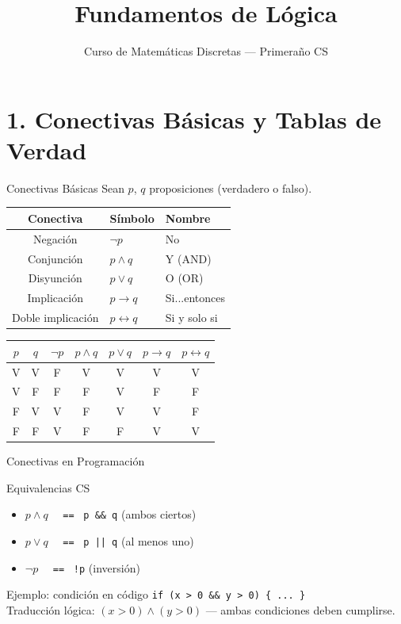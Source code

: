 \documentclass[aspectratio=169,10pt]{beamer}
\title{Fundamentos de Lógica}
\subtitle{Curso de Matemáticas Discretas — Primeraño CS}
\author{}
\date{}
\begin{document}
\section{1. Conectivas Básicas y Tablas de Verdad}

\begin{frame}{Conectivas Básicas}
Sean $p$, $q$ proposiciones (verdadero o falso).

\vspace{0.4em}
\begin{tabular}{cll}
\hline
\textbf{Conectiva} & \textbf{Símbolo} & \textbf{Nombre} \\
\hline
Negación & $\neg p$ & \alert{No} \\
Conjunción & $p \land q$ & \alert{Y} (AND) \\
Disyunción & $p \lor q$ & \alert{O} (OR) \\
Implicación & $p \to q$ & \alert{Si...entonces} \\
Doble implicación & $p \leftrightarrow q$ & \alert{Si y solo si} \\
\hline
\end{tabular}

\vspace{1em}
\small
\begin{tabular}{cc|ccccc}
$p$ & $q$ & $\neg p$ & $p\land q$ & $p\lor q$ & $p\to q$ & $p\leftrightarrow q$ \\ \hline
V & V & F & V & V & V & V \\
V & F & F & F & V & F & F \\
F & V & V & F & V & V & F \\
F & F & V & F & F & V & V
\end{tabular}
\end{frame}

\begin{frame}{Conectivas en Programación}
\begin{block}{Equivalencias CS}
\begin{itemize}
\item $p \land q$  \ \ \texttt{==} \ \texttt{p \&\& q}  \quad (ambos ciertos)
\item $p \lor q$    \ \ \texttt{==} \ \texttt{p || q}   \quad (al menos uno)
\item $\neg p$      \ \ \texttt{==} \ \texttt{!p}         \quad (inversión)
\end{itemize}
\end{block}
\vfill
\begin{block}{Ejemplo: condición en código}
\texttt{if (x > 0 \&\& y > 0) \{ ... \}} \\
\pause
Traducción lógica: $(x>0) \land (y>0)$ — ambas condiciones deben cumplirse.
\end{block}
\end{frame}
\end{document}

